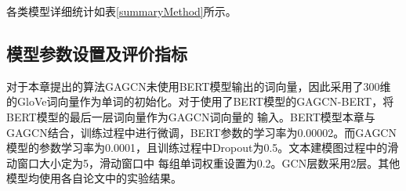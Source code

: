 各类模型详细统计如表\ref{summaryMethod}所示。
\begin{table}[htb]
	\centering
	\caption{算法模型统计}
\end{table}

\subsection{模型参数设置及评价指标}
对于本章提出的算法GAGCN未使用BERT模型输出的词向量，因此采用了300维的GloVe词向量作为单词的初始化。对于使用了BERT模型的GAGCN-BERT，将BERT模型的最后一层词向量作为GAGCN词向量的
输入。BERT模型本章与GAGCN结合，训练过程中进行微调，BERT参数的学习率为0.00002。而GAGCN模型的参数学习率为0.0001，且训练过程中Dropout为0.5。文本建模图过程中的滑动窗口大小定为5，滑动窗口中
每组单词权重设置为0.2。GCN层数采用2层。其他模型均使用各自论文中的实验结果。

